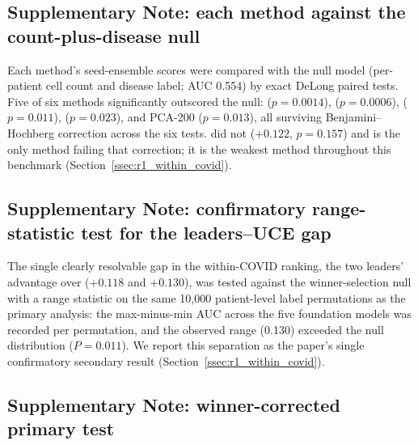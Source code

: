 \subsection{Supplementary Note: each method against the count-plus-disease null}
\label{sn:method_vs_null}

Each method's seed-ensemble scores were compared with the null model
(per-patient cell count and disease label; AUC 0.554) by exact DeLong paired
tests. Five of six methods significantly outscored the null: 
($p = 0.0014$),  ($p = 0.0006$), 
($p = 0.011$),  ($p = 0.023$), and PCA-200 ($p = 0.013$), all
surviving Benjamini--Hochberg correction across the six tests. 
did not ($+0.122$, $p = 0.157$) and is the only method failing that
correction; it is the weakest method throughout this benchmark
(Section~\ref{ssec:r1_within_covid}).

\subsection{Supplementary Note: confirmatory range-statistic test for the leaders--UCE gap}
\label{sn:range_test}

The single clearly resolvable gap in the within-COVID ranking, the two
leaders' advantage over  ($+0.118$ and $+0.130$), was tested
against the winner-selection null with a range statistic on the same 10{,}000
patient-level label permutations as the primary analysis: the max-minus-min
AUC across the five foundation models was recorded per permutation, and the
observed range (0.130) exceeded the null distribution
($P = 0.011$). We report this separation as the paper's single confirmatory
secondary result (Section~\ref{ssec:r1_within_covid}).

\subsection{Supplementary Note: winner-corrected primary test}
\label{sn:winner_test}


